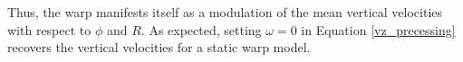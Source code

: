 \documentclass{nature}
\begin{document}
\begin{methods}
Thus, the warp manifests itself as a modulation of the mean vertical velocities with respect to $\phi$ and $R$. As expected, setting $\omega=0$ in Equation \ref{vz_precessing} recovers the vertical velocities for a static warp model\cite{Poggio:2017}. 





\end{methods}
\end{document}
